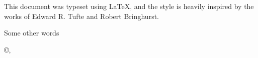\cleardoublepage
\thispagestyle{empty}
\hfill
\vfill
\noindent This document was typeset using \LaTeX{}, and the style is heavily inspired by the works of Edward R. Tufte and Robert Bringhurst.
    \par
    Some other words

    
    \vspace{3em}
    \noindent\textit{\MyTitle}
    
    \noindent\copyright \MyDate, \MyAuthor
\cleardoublepage